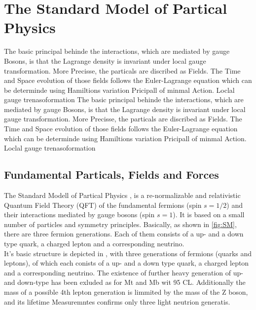 \chapter{The Standard Model of Partical Physics}
\label{sec:SM}
The basic principal behinde the interactions, which are mediated by gauge Bosons, is  that the Lagrange density is invariant under local gauge transformation. More Precisse, the particals are discribed as Fields. The Time and Space evolution of those fields follows the Euler-Lagrange equation which can be determinde using Hamiltions variation Pricipall of minmal Action. 
Loclal gauge trenasoformation
The basic principal behinde the interactions, which are mediated by gauge Bosons, is  that the Lagrange density is invariant under local gauge transformation. More Precisse, the particals are discribed as Fields. The Time and Space evolution of those fields follows the Euler-Lagrange equation which can be determinde using Hamiltions variation Pricipall of minmal Action. 
Loclal gauge trenasoformation
\section{Fundamental  Particals, Fields and Forces }\label{key:SM 2}

The Standard Modell of Partical Physics \cite{glashow1961partial,glashow1970weak,gross1973asymptotically,politzer1973reliable,politzer1974asymptotic,salam1964electromagnetic,weinberg1967model}, is a re-normalizable and relativistic Quantum Field Theory (QFT) of the fundamental fermions (spin $s =1/2$) and their interactions mediated by gauge bosons (spin $s = 1$).  It is based on a small number of particles and symmetry principles. Basically, as shown in \cref{fig:SM}, there are three fermion generations. Each of them consists of  a up- and a down type quark, a charged lepton and a corresponding neutrino. \\ 

It's basic structure is depicted in   , with three generations of fermions (quarks and leptons), of which each conists of a up- and a down type quark, a charged lepton and a corresponding neutrino.  The existence of further heavy  generation of up- and down-type has been exluded as for Mt and Mb wit 95 CL.
Additionally the mass of a possible 4th lepton generation is limmited by the mass of the Z boson, and its lifetime Measuremntes confirms only three light neutrion generatis. \\ 

